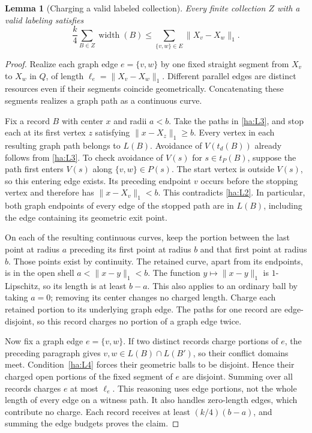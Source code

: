 \documentclass[11pt]{amsart}
\newtheorem{lemma}[theorem]{Lemma}
\theoremstyle{definition}
\theoremstyle{remark}
\numberwithin{equation}{section}
\begin{document}
\begin{lemma}[Charging a valid labeled collection]\label{ha:labeled-energy}
Every finite collection $Z$ with a valid labeling satisfies
\[
       \frac{k}{4}\sum_{B\in Z}\operatorname{width}(B)
       \le \sum_{\{v,w\}\in E}\|X_v-X_w\|_1.
\]
\end{lemma}
\begin{proof}
Realize each graph edge $e=\{v,w\}$ by one fixed straight segment
from $X_v$ to $X_w$ in $Q$, of length $\ell_e=\|X_v-X_w\|_1$.
Different parallel edges are distinct resources even if their
segments coincide geometrically.  Concatenating these segments
realizes a graph path as a continuous curve.

Fix a record $B$ with center $x$ and radii $a<b$.  Take the paths in
\ref{ha:L3}, and stop each at its first vertex $z$ satisfying
$\|x-X_z\|_1\ge b$.  Every vertex in each resulting graph path
belongs to $L(B)$.  Avoidance of $V(t_d(B))$ already follows from
\ref{ha:L3}.  To check avoidance of $V(s)$ for $s\in t_P(B)$,
suppose the path first enters $V(s)$ along $\{v,w\}\in P(s)$.
The start vertex is outside $V(s)$, so this entering edge exists.
Its preceding endpoint $v$ occurs before the stopping vertex and
therefore has $\|x-X_v\|_1<b$.  This contradicts \ref{ha:L2}.
In particular, both graph endpoints of every edge of the stopped
path are in $L(B)$, including the edge containing its geometric
exit point.

On each of the resulting continuous curves, keep the portion between
the last point at radius $a$ preceding its first point at radius $b$
and that first point at radius $b$.  Those points exist by continuity.
The retained curve, apart from its endpoints, is in the open shell
$a<\|x-y\|_1<b$.  The function $y\mapsto\|x-y\|_1$ is
$1$-Lipschitz, so its length is at least $b-a$.  This also applies to
an ordinary ball by taking $a=0$; removing its center changes no
charged length.  Charge each retained portion to its underlying
graph edge.  The paths for one record are edge-disjoint, so this
record charges no portion of a graph edge twice.

Now fix a graph edge $e=\{v,w\}$.  If two distinct records charge
portions of $e$, the preceding paragraph gives
$v,w\in L(B)\cap L(B')$, so their conflict domains meet.
Condition~\ref{ha:L4} forces their geometric balls to be disjoint.
Hence their charged open portions of the fixed segment of $e$ are
disjoint.  Summing over all records charges $e$ at most $\ell_e$.
This reasoning uses edge portions, not the whole length of every
edge on a witness path.  It also handles zero-length edges, which
contribute no charge.  Each record receives at least
$(k/4)(b-a)$, and summing the edge budgets proves the claim.
\end{proof}
\end{document}
